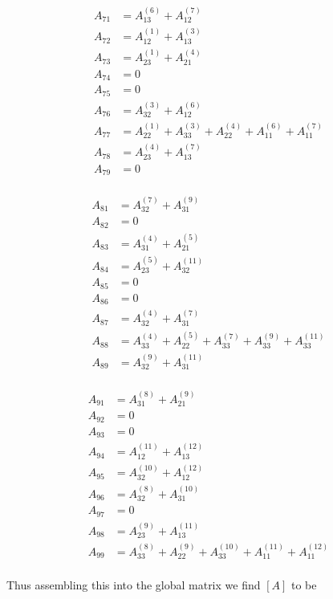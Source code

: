 \documentclass[9pt]{amsart}
\newcommand{\e}[2]{_{#1}^{(#2)}}
\begin{document}
\begin{multicols}{3}
  \begin{align*}
    A_{71}&=A\e{13}{6}+A\e{12}{7}\\
    A_{72}&=A\e{12}{1}+A\e{13}{3}\\
    A_{73}&=A\e{23}{1}+A\e{21}{4}\\
    A_{74}&=0\\
    A_{75}&=0\\
    A_{76}&=A\e{32}{3}+A\e{12}{6}\\
    A_{77}&=A\e{22}{1}+A\e{33}{3}+A\e{22}{4}+A\e{11}{6}+A\e{11}{7}\\
    A_{78}&=A\e{23}{4}+A\e{13}{7}\\
    A_{79}&=0\\
  \end{align*}

  \begin{align*}
    A_{81}&=A\e{32}{7}+A\e{31}{9}\\
    A_{82}&=0\\
    A_{83}&=A\e{31}{4}+A\e{21}{5}\\
    A_{84}&=A\e{23}{5}+A\e{32}{11}\\
    A_{85}&=0\\
    A_{86}&=0\\
    A_{87}&=A\e{32}{4}+A\e{31}{7}\\
    A_{88}&=A\e{33}{4}+A\e{22}{5}+A\e{33}{7}+A\e{33}{9}+A\e{33}{11}\\
    A_{89}&=A\e{32}{9}+A\e{31}{11}\\
  \end{align*}

  \begin{align*}
    A_{91}&=A\e{31}{8}+A\e{21}{9}\\
    A_{92}&=0\\
    A_{93}&=0\\
    A_{94}&=A\e{12}{11}+A\e{13}{12}\\
    A_{95}&=A\e{32}{10}+A\e{12}{12}\\
    A_{96}&=A\e{32}{8}+A\e{31}{10}\\
    A_{97}&=0\\
    A_{98}&=A\e{23}{9}+A\e{13}{11}\\
    A_{99}&=A\e{33}{8}+A\e{22}{9}+A\e{33}{10}+A\e{11}{11}+A\e{11}{12}\\
  \end{align*}
\end{multicols}

Thus assembling this into the global matrix we find $[A]$ to be
\end{document}
